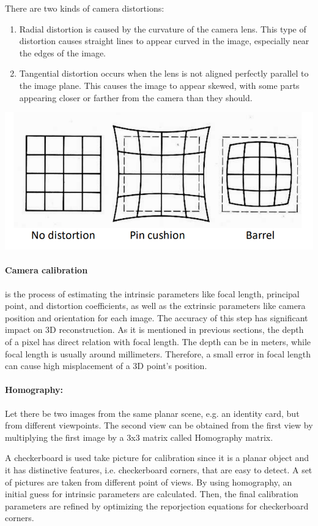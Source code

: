 \documentclass[11pt]{article}
\begin{document}
    There are two kinds of camera distortions:

    \begin{enumerate}
        \item Radial distortion is caused by the curvature of the camera lens. This type of distortion
        causes straight lines to appear curved in the image, especially near the edges of the image.
        \item Tangential distortion occurs when the lens is not aligned perfectly parallel to the image plane.
        This causes the image to appear skewed, with some parts appearing closer or farther from the camera
        than they should.
    \end{enumerate}
    {\includegraphics[width=\textwidth,height=\textheight,keepaspectratio]{distortion.PNG}}

    \paragraph{Camera calibration} is the process of estimating the intrinsic parameters like focal length,
    principal point, and distortion coefficients, as well as the extrinsic parameters like camera position
    and orientation for each image. The accuracy of this step has significant impact on 3D reconstruction.
    As it is mentioned in previous sections, the depth of a pixel has direct relation with focal length. The depth
    can be in meters, while focal length is usually around millimeters. Therefore, a small error in focal length
    can cause high misplacement of a 3D point's position.

    \paragraph{Homography:} Let there be two images from the same planar scene, e.g. an identity card, but from
    different viewpoints. The second view can be obtained from the first view by multiplying the first image by
    a 3x3 matrix called Homography matrix.

    A checkerboard is used take picture for calibration since it is a planar object and it has distinctive features,
    i.e. checkerboard corners, that are easy to detect. A set of pictures are taken from different point of views.
    By using homography, an initial guess for intrinsic parameters are calculated. Then, the final calibration
    parameters are refined by optimizing the reporjection equations for checkerboard corners.
\end{document}
